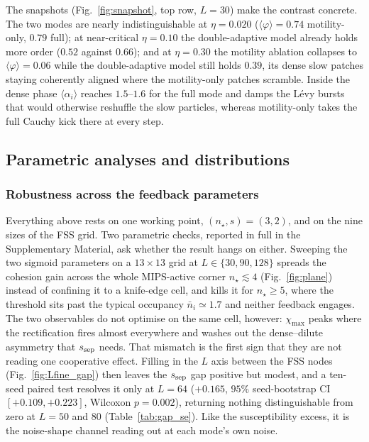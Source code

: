 \documentclass[11pt,a4paper]{article}
\begin{document}
The snapshots (Fig.~\ref{fig:snapshot}, top row, $L = 30$) make
the contrast concrete. The two modes are nearly
indistinguishable at $\eta = 0.020$ ($\langle\varphi\rangle =
0.74$ motility-only, $0.79$ full); at near-critical
$\eta = 0.10$ the double-adaptive model already holds more order
($0.52$ against $0.66$); and at $\eta = 0.30$ the motility
ablation collapses to $\langle\varphi\rangle = 0.06$ while the
double-adaptive model still holds $0.39$, its dense slow patches
staying coherently aligned where the motility-only patches
scramble. Inside the
dense phase $\langle\alpha_i\rangle$ reaches $1.5$--$1.6$ for
the full mode and damps the L\'evy bursts that would otherwise
reshuffle the slow particles, whereas motility-only takes the
full Cauchy kick there at every step.

\subsection{Parametric analyses and distributions}
\label{sec:results-parametric}

\subsubsection{Robustness across the feedback parameters}

Everything above rests on one working point,
$(n_\star, s) = (3, 2)$, and on the nine sizes of the FSS grid.
Two parametric checks, reported in full in the Supplementary
Material, ask whether the result hangs on either. Sweeping the
two sigmoid parameters on a $13 \times 13$ grid at
$L \in \{30, 90, 128\}$ spreads the cohesion gain across the
whole MIPS-active corner $n_\star \lesssim 4$
(Fig.~\ref{fig:plane}) instead of confining it to a knife-edge
cell, and kills it for $n_\star \ge 5$, where the threshold sits
past the typical occupancy $\bar n_i \simeq 1.7$ and neither
feedback engages. The two observables do not optimise on the same
cell, however: $\chi_{\max}$ peaks where the rectification fires
almost everywhere and washes out the dense--dilute asymmetry that
$s_{\rm sep}$ needs. That mismatch is the first sign that they
are not reading one cooperative effect. Filling in the $L$ axis
between the FSS nodes (Fig.~\ref{fig:Lfine_gap}) then leaves the
$s_{\rm sep}$ gap positive but modest, and a ten-seed paired test
resolves it only at $L = 64$ ($+0.165$, $95\%$ seed-bootstrap CI
$[+0.109, +0.223]$, Wilcoxon $p = 0.002$), returning nothing
distinguishable from zero at $L = 50$ and $80$
(Table~\ref{tab:gap_se}). Like the susceptibility excess, it is
the noise-shape channel reading out at each mode's own noise.
\end{document}
